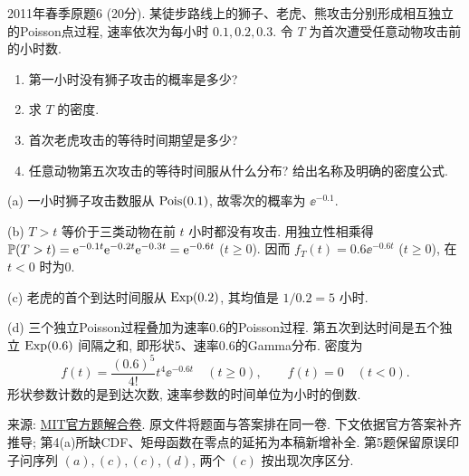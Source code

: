 \begin{exercise}\label{m2:2011s:q6}
2011年春季原题6 (20分). 某徒步路线上的狮子、老虎、熊攻击分别形成相互独立的Poisson点过程, 速率依次为每小时 $0.1,0.2,0.3$. 令 $T$ 为首次遭受任意动物攻击前的小时数.
\begin{enumerate}
\item[(a)]\label{m2:2011s:q6:a} 第一小时没有狮子攻击的概率是多少?
\item[(b)]\label{m2:2011s:q6:b} 求 $T$ 的密度.
\item[(c)]\label{m2:2011s:q6:c} 首次老虎攻击的等待时间期望是多少?
\item[(d)]\label{m2:2011s:q6:d} 任意动物第五次攻击的等待时间服从什么分布? 给出名称及明确的密度公式.
\end{enumerate}
\end{exercise}
\begin{solution}
(a) 一小时狮子攻击数服从 $\operatorname{Pois}(0.1)$, 故零次的概率为 $\ee^{-0.1}$.

(b) $T>t$ 等价于三类动物在前 $t$ 小时都没有攻击. 用独立性相乘得 $\mathbb P(T>t)=\mathrm e^{-0.1t}\mathrm e^{-0.2t}\mathrm e^{-0.3t}=\mathrm e^{-0.6t}$ ($t\ge0$). 因而 $f_T(t)=0.6\ee^{-0.6t}$ ($t\ge0$), 在 $t<0$ 时为0.

(c) 老虎的首个到达时间服从 $\operatorname{Exp}(0.2)$, 其均值是 $1/0.2=5$ 小时.

(d) 三个独立Poisson过程叠加为速率0.6的Poisson过程. 第五次到达时间是五个独立 $\operatorname{Exp}(0.6)$ 间隔之和, 即形状5、速率0.6的Gamma分布. 密度为
\[
f(t)=\frac{(0.6)^5}{4!}t^4\ee^{-0.6t}\quad(t\ge0),\qquad f(t)=0\quad(t<0).
\]
形状参数计数的是到达次数, 速率参数的时间单位为小时的倒数.
\end{solution}

来源: \href{https://ocw.mit.edu/courses/18-600-probability-and-random-variables-fall-2019/resources/mit18_600f19_mid2_f2011/}{MIT官方题解合卷}. 原文件将题面与答案排在同一卷. 下文依据官方答案补齐推导; 第4(a)所缺CDF、矩母函数在零点的延拓为本稿新增补全. 第5题保留原误印子问序列 $(a),(c),(c),(d)$, 两个 $(c)$ 按出现次序区分.

